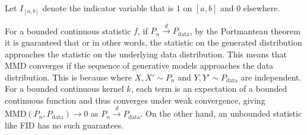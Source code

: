 \documentclass{article}
\begin{document}

Let $I_{[a,b]}$ denote the indicator variable that is $1$ on
$[a,b]$ and $0$ elsewhere.


For a bounded continuous statistic $f$, if $P_n\xrightarrow{d}
P_\text{data}$, by the Portmanteau theorem it is guaranteed that
or in other words, the statistic on the generated distribution
approaches the statistic on the underlying data distribution. This
means that MMD converges if the sequence of generative models
approaches the data distribution. This is because
where $X,X'\sim P_n$ and $Y,Y'\sim P_\text{data}$ are independent.
For a bounded continuous kernel $k$, each term is an
expectation of a bounded continuous function and thus converges under
weak convergence, giving $\mathrm{MMD}(P_n, P_\text{data})\to 0$ as
$P_n\xrightarrow{d} P_\text{data}$. On the other hand, an unbounded
statistic like FID has no such guarantees.
\end{document}
